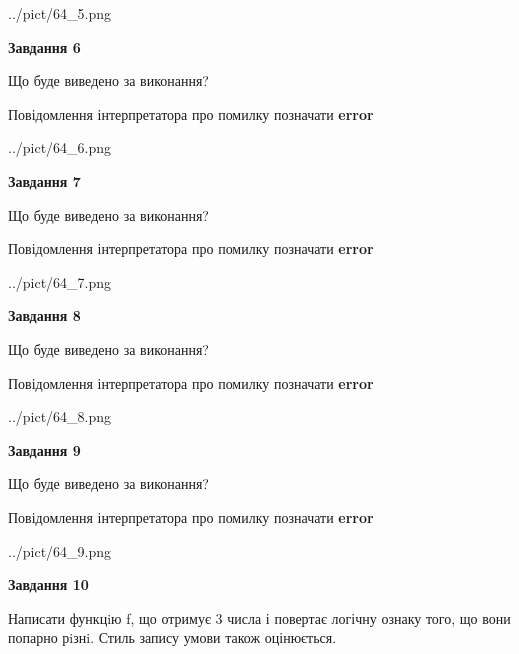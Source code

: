 \documentclass[12pt, ukrainian]{article}
\begin{document}
{\begin {large}
\begin{center}
	{../pict/64_5.png}
\end{center}
\newpage

{\begin {center}\textbf{Завдання 6}\end {center}}\par
Що буде виведено за виконання? \par
Повідомлення інтерпретатора про помилку позначати \textbf{error}

\begin{center}
	{../pict/64_6.png}
\end{center}
\newpage

{\begin {center}\textbf{Завдання 7}\end {center}}\par
Що буде виведено за виконання? \par
Повідомлення інтерпретатора про помилку позначати \textbf{error}

\begin{center}
	{../pict/64_7.png}
\end{center}
\newpage

{\begin {center}\textbf{Завдання 8}\end {center}}\par
Що буде виведено за виконання? \par
Повідомлення інтерпретатора про помилку позначати \textbf{error}

\begin{center}
	{../pict/64_8.png}
\end{center}
\newpage

{\begin {center}\textbf{Завдання 9}\end {center}}\par
Що буде виведено за виконання? \par
Повідомлення інтерпретатора про помилку позначати \textbf{error}

\begin{center}
	{../pict/64_9.png}
\end{center}
\newpage

{\begin {center}\textbf{Завдання 10}\end {center}}\par

Написати функцiю f, що отримує 3 числа і повертає логічну ознаку того, що вони попарно рiзнi. Стиль запису умови також оцінюється.\par
\newpage

\end {large}}
\end{document}

